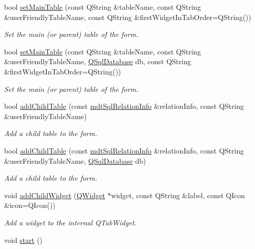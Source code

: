 \begin{DoxyCompactItemize}
bool \hyperlink{classmdt_sql_form_abe4cc1a317d8e76aed7b408184c8712e}{set\-Main\-Table} (const Q\-String \&table\-Name, const Q\-String \&user\-Friendly\-Table\-Name, const Q\-String \&first\-Widget\-In\-Tab\-Order=Q\-String())
\begin{DoxyCompactList}\small\item\em Set the main (or parent) table of the form. \end{DoxyCompactList}\item 
bool \hyperlink{classmdt_sql_form_aee00ca6122b6a18a72b861e691fd035a}{set\-Main\-Table} (const Q\-String \&table\-Name, const Q\-String \&user\-Friendly\-Table\-Name, \hyperlink{class_q_sql_database}{Q\-Sql\-Database} db, const Q\-String \&first\-Widget\-In\-Tab\-Order=Q\-String())
\begin{DoxyCompactList}\small\item\em Set the main (or parent) table of the form. \end{DoxyCompactList}\item 
bool \hyperlink{classmdt_sql_form_a9c48a7af83effbc50e9171a8d7ff3889}{add\-Child\-Table} (const \hyperlink{classmdt_sql_relation_info}{mdt\-Sql\-Relation\-Info} \&relation\-Info, const Q\-String \&user\-Friendly\-Table\-Name)
\begin{DoxyCompactList}\small\item\em Add a child table to the form. \end{DoxyCompactList}\item 
bool \hyperlink{classmdt_sql_form_a0ffbb237eef4cb3b4e9b458860ef411d}{add\-Child\-Table} (const \hyperlink{classmdt_sql_relation_info}{mdt\-Sql\-Relation\-Info} \&relation\-Info, const Q\-String \&user\-Friendly\-Table\-Name, \hyperlink{class_q_sql_database}{Q\-Sql\-Database} db)
\begin{DoxyCompactList}\small\item\em Add a child table to the form. \end{DoxyCompactList}\item 
void \hyperlink{classmdt_sql_form_a86174e002c2dd5496ab74a7eb67c614c}{add\-Child\-Widget} (\hyperlink{class_q_widget}{Q\-Widget} $\ast$widget, const Q\-String \&label, const Q\-Icon \&icon=Q\-Icon())
\begin{DoxyCompactList}\small\item\em Add a widget to the internal Q\-Tab\-Widget. \end{DoxyCompactList}\item 
void \hyperlink{classmdt_sql_form_a101b73d24864dd208968ca6dfe5f8cd8}{start} ()

\end{DoxyCompactItemize}
